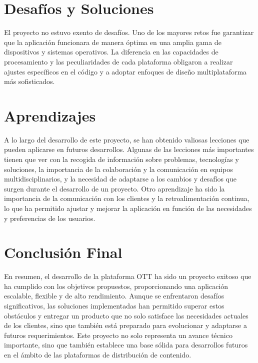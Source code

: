 \section{Desafíos y Soluciones}
\label{sec:conclusiones:desafios}

El proyecto no estuvo exento de desafíos. Uno de los mayores retos fue garantizar que la aplicación funcionara de manera 
óptima en una amplia gama de dispositivos y sistemas operativos. La diferencia en las capacidades de procesamiento y las 
peculiaridades de cada plataforma obligaron a realizar ajustes específicos en el código y a adoptar enfoques de diseño 
multiplataforma más sofisticados.

\section{Aprendizajes}
\label{sec:conclusiones:mejoras}

A lo largo del desarrollo de este proyecto, se han obtenido valiosas lecciones que pueden aplicarse en futuros desarrollos. 
Algunas de las lecciones más importantes tienen que ver con la recogida de información sobre problemas, tecnologías y
soluciones, la importancia de la colaboración y la comunicación en equipos multidisciplinarios, y la necesidad de adaptarse
a los cambios y desafíos que surgen durante el desarrollo de un proyecto. Otro aprendizaje ha sido la importancia de la
comunicación con los clientes y la retroalimentación continua, lo que ha permitido ajustar y mejorar la aplicación en función
de las necesidades y preferencias de los usuarios.

\section{Conclusión Final}
\label{sec:conclusiones:final}

En resumen, el desarrollo de la plataforma OTT ha sido un proyecto exitoso que ha cumplido con los objetivos propuestos, 
proporcionando una aplicación escalable, flexible y de alto rendimiento. Aunque se enfrentaron desafíos significativos, 
las soluciones implementadas han permitido superar estos obstáculos y entregar un producto que no solo satisface las 
necesidades actuales de los clientes, sino que también está preparado para evolucionar y adaptarse a futuros requerimientos. 
Este proyecto no solo representa un avance técnico importante, sino que también establece una base sólida para desarrollos 
futuros en el ámbito de las plataformas de distribución de contenido.
